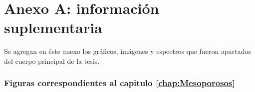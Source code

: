 \cleardoublepage{}
{}
\FormatoAnexoA

\AddLabelsAxUno

\let\originalstyle=\thispagestyle            %
\def\thispagestyle#1{\fancyfoot[C]{}}       %
\def\thispagestyle#1{\originalstyle{empty}} %
\def\thispagestyle#1{}                       %

\renewcommand\thefigure{A.\arabic{figure}} 

\chapter*{Anexo A: información suplementaria}
    
    Se agregan en éste anexo los gráficos, imágenes y espectros que fueron apartados del cuerpo principal de la tesis. 

    \subsection*{Figuras correspondientes al capitulo \ref{chap:Mesoporosos}}


